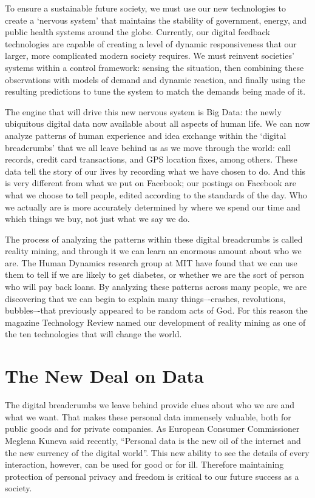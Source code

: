 To ensure a sustainable future society, we must use our new technologies to create a `nervous system’ that maintains the stability of government, energy, and public health systems around the globe.
Currently, our digital feedback technologies are capable of creating a level of dynamic responsiveness that our larger, more complicated modern society requires.
We must reinvent societies’ systems within a control framework: sensing the situation, then combining these observations with models of demand and dynamic reaction, and finally using the resulting predictions to tune the system to match the demands being made of it.

The engine that will drive this new nervous system is Big Data: the newly ubiquitous digital data now available about all aspects of human life.
We can now analyze patterns of human experience and idea exchange within the `digital breadcrumbs’ that we all leave behind us as we move through the world: call records, credit card transactions, and GPS location fixes, among others.
These data tell the story of our lives by recording what we have chosen to do.
And this is very different from what we put on Facebook; our postings on Facebook are what we choose to tell people, edited according to the standards of the day.
Who we actually are is more accurately determined by where we spend our time and which things we buy, not just what we say we do.

The process of analyzing the patterns within these digital breadcrumbs is called reality mining, and through it we can learn an enormous amount about who we are.
The Human Dynamics research group at MIT have found that we can use them to tell if we are likely to get diabetes, or whether we are the sort of person who will pay back loans.
By analyzing these patterns across many people, we are discovering that we can begin to explain many things–-crashes, revolutions, bubbles–-that previously appeared to be random acts of God.
For this reason the magazine Technology Review named our development of reality mining as one of the ten technologies that will change the world. 

\section{The New Deal on Data}

The digital breadcrumbs we leave behind provide clues about who we are and what we want.
That makes these personal data immensely valuable, both for public goods and for private companies.
As European Consumer Commissioner Meglena Kuneva said recently, “Personal data is the new oil of the internet and the new currency of the digital world”.
This new ability to see the details of every interaction, however, can be used for good or for ill.
Therefore maintaining protection of personal privacy and freedom is critical to our future success as a society.

